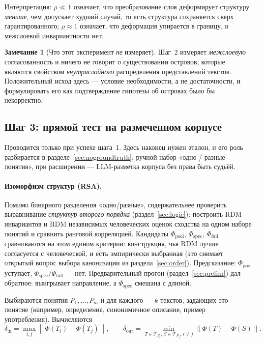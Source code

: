 \documentclass[11pt,a4paper]{article}
\theoremstyle{definition}
\newtheorem{remark}[definition]{Замечание}
\theoremstyle{plain}
\newcommand{\norm}[1]{\left\lVert #1 \right\rVert}
\begin{document}
Интерпретация: $\rho\ll 1$ означает, что преобразование слоя деформирует структуру
\emph{меньше}, чем допускает худший случай, то есть структура сохраняется сверх гарантированного;
$\rho\approx 1$ означает, что деформация упирается в границу, и межслоевой инвариантности нет.

\begin{remark}[Что этот эксперимент \emph{не} измеряет]
Шаг~2 измеряет \emph{межслоевую} согласованность и ничего не говорит о существовании
островов, которые являются свойством \emph{внутрислойного} распределения представлений
текстов. Положительный исход здесь — условие необходимости, а не достаточности, и
формулировать его как подтверждение гипотезы об островах было бы некорректно.
\end{remark}

\subsection{Шаг 3: прямой тест на размеченном корпусе}\label{sec:level2}

Проводится только при успехе шага~1. Здесь наконец нужен эталон, и его роль разбирается в
разделе~\ref{sec:nogroundtruth}: ручной набор «одно / разные понятия», при расширении —
LLM-разметка корпуса без права быть судьёй.

\paragraph{Изоморфизм структур (RSA).} Помимо бинарного разделения «одно/разные»,
содержательнее проверить выравнивание \emph{структур второго порядка}
(раздел~\ref{sec:logic}): построить RDM инвариантов и RDM независимых человеческих оценок
сходства на одном наборе понятий и сравнить ранговой корреляцией. Кандидаты
$\Phi_{\mathrm{pool}}$, $\Phi_{\mathrm{spec}}$, $\Phi_{\mathrm{full}}$ сравниваются на этом
едином критерии: конструкция, чья RDM лучше согласуется с человеческой, и есть эмпирически
выбранная (это снимает открытый вопрос выбора канонизации из раздела~\ref{sec:order}).
Предсказание: $\Phi_{\mathrm{pool}}$ уступает, $\Phi_{\mathrm{spec}}/\Phi_{\mathrm{full}}$ —
нет. Предварительный прогон (раздел~\ref{sec:prelim}) дал обратное: выигрывает направление,
а $\Phi_{\mathrm{spec}}$ смешана с длиной.

Выбираются понятия $P_1,\dots,P_m$ и для каждого — $k$ текстов, задающих это понятие
(например, определение, синонимичное описание, пример употребления). Вычисляются
\begin{equation}\label{eq:crit}
\delta_{\mathrm{in}}=\max_{i,j}\norm{\Phi(T_i)-\Phi(T_j)},\qquad
\delta_{\mathrm{out}}=\min_{T\in\mathcal T_{P_i},\,S\in\mathcal T_{P_j},\,i\ne j}\norm{\Phi(T)-\Phi(S)}.
\end{equation}
\end{document}
